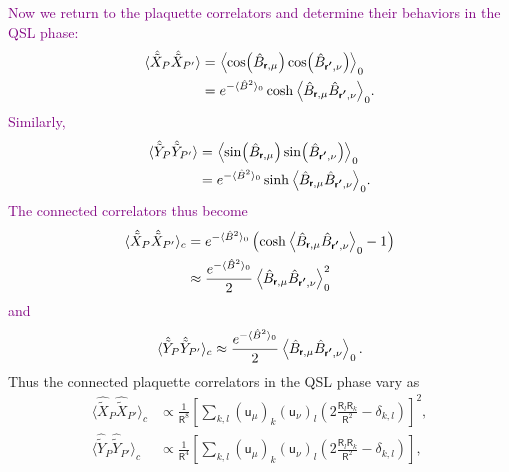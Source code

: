 \documentclass[twocolumn,superscriptaddress,amsmath,amssymb,aps,prx,nofootinbib]{revtex4-2}
\newcommand{\dual}[1]{\boldsymbol{\mathsf{#1}}}
\newcommand{\newtext}[1]{\textcolor{purple}{#1}}
\begin{document}
\newtext{Now we return to the plaquette correlators and determine their behaviors in the QSL phase:
\begin{equation}
\begin{aligned}
    \langle \hat{\tilde{X}}_P \hat{\tilde{X}}_{P'} \rangle & = \expval{ \cos(\hat{B}_{\dual{r},\mu}) \cos(\hat{B}_{\dual{r'},\nu}) }_0\\
    & = e^{-\langle \hat{B}^2\rangle_0} \cosh{ \expval{\hat{B}_{\dual{r},\mu} \hat{B}_{\dual{r'},\nu}} _0 }.
\end{aligned}
\end{equation}
Similarly,
\begin{equation}
\begin{aligned}
    \langle \hat{\tilde{Y}}_P \hat{\tilde{Y}}_{P'} \rangle & = \expval{ \sin(\hat{B}_{\dual{r},\mu}) \sin(\hat{B}_{\dual{r'},\nu}) }_0\\
    & = e^{-\langle \hat{B}^2\rangle_0} \sinh{ \expval{\hat{B}_{\dual{r},\mu} \hat{B}_{\dual{r'},\nu}} _0 }.
\end{aligned}
\end{equation}
The connected correlators thus become
\begin{equation}
\begin{aligned}
    \langle \hat{\tilde{X}}_P \hat{\tilde{X}}_{P'} \rangle_c &= e^{-\langle \hat{B}^2\rangle_0} \left( \cosh{ \expval{\hat{B}_{\dual{r},\mu} \hat{B}_{\dual{r'},\nu}} _0 } - 1\right)\\
    & \approx \frac{e^{-\langle \hat{B}^2\rangle_0}}{2}   \expval{\hat{B}_{\dual{r},\mu} \hat{B}_{\dual{r'},\nu}}_0^2  
\end{aligned}
\end{equation}
and 
\begin{equation}
    \langle \hat{\tilde{Y}}_P \hat{\tilde{Y}}_{P'} \rangle_c  \approx \frac{e^{-\langle \hat{B}^2\rangle_0}}{2}   \expval{\hat{B}_{\dual{r},\mu} \hat{B}_{\dual{r'},\nu}}_0.  
\end{equation}
}
Thus the connected plaquette correlators in the QSL phase vary as
\begin{equation}\label{eq:correlator_theoretical}
  \begin{aligned}
    \langle \hat{\tilde{X}}_P \hat{\tilde{X}}_{P'} \rangle_c & \propto \frac{1}{\mathsf{R}^8} \left[ \sum_{k,l  } ( \dual{u}_\mu )_k ( \dual{u}_\nu )_l  \left(  2 \frac{\mathsf{R}_l \mathsf{R}_k}{\mathsf{R}^2} -  \delta_{k,l} \right) \right]^2 ,\\
    \langle \hat{\tilde{Y}}_P \hat{\tilde{Y}}_{P'} \rangle_c &  \propto \frac{1}{\mathsf{R}^4} \left[ \sum_{k,l  } ( \dual{u}_\mu )_k ( \dual{u}_\nu )_l  \left(  2 \frac{\mathsf{R}_l \mathsf{R}_k}{\mathsf{R}^2} -  \delta_{k,l} \right) \right],
\end{aligned}
\end{equation}
\end{document}
